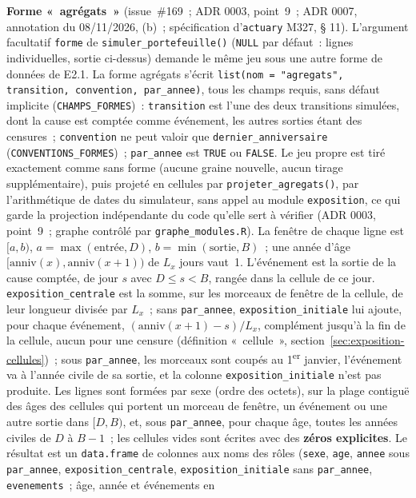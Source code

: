 \documentclass[a4paper,11pt]{article}
\newcommand{\code}[1]{\texttt{\small #1}}
\begin{document}
\medskip
\textbf{Forme «~agrégats~»} (issue~\#169~; ADR 0003, point~9~; ADR 0007,
annotation du 08/11/2026, (b)~; spécification d'\code{actuary} M327,
§ 11). L'argument facultatif \code{forme} de \code{simuler\_portefeuille()}
(\code{NULL} par défaut~: lignes individuelles, sortie ci-dessus) demande le
même jeu sous une autre forme de données de E2.1. La forme agrégats
s'écrit \code{list(nom = "agregats", transition, convention, par\_annee)},
tous les champs requis, sans défaut implicite (\code{CHAMPS\_FORMES})~:
\code{transition} est l'une des deux transitions simulées, dont la cause
est comptée comme événement, les autres sorties étant des censures~;
\code{convention} ne peut valoir que \code{dernier\_anniversaire}
(\code{CONVENTIONS\_FORMES})~; \code{par\_annee} est \code{TRUE} ou
\code{FALSE}. Le jeu propre est tiré exactement comme sans forme (aucune
graine nouvelle, aucun tirage supplémentaire), puis projeté en cellules par
\code{projeter\_agregats()}, par l'arithmétique de dates du simulateur,
sans appel au module \code{exposition}, ce qui garde la projection
indépendante du code qu'elle sert à vérifier (ADR 0003, point~9~; graphe
contrôlé par \code{graphe\_modules.R}). La fenêtre de chaque ligne est
$[a, b)$, $a = \max(\text{entrée}, D)$, $b = \min(\text{sortie}, B)$~; une
année d'âge $[\text{anniv}(x), \text{anniv}(x + 1))$ de $L_x$ jours vaut~1.
L'événement est la sortie de la cause comptée, de jour $s$ avec
$D \le s < B$, rangée dans la cellule de ce jour.
\code{exposition\_centrale} est la somme, sur les morceaux de fenêtre de la
cellule, de leur longueur divisée par $L_x$~; sans \code{par\_annee},
\code{exposition\_initiale} lui ajoute, pour chaque événement,
$(\text{anniv}(x + 1) - s) / L_x$, complément jusqu'à la fin de la cellule,
aucun pour une censure (définition «~cellule~», section~\ref{sec:exposition-cellules})~;
sous \code{par\_annee}, les morceaux sont coupés au 1\textsuperscript{er}
janvier, l'événement va à l'année civile de sa sortie, et la colonne
\code{exposition\_initiale} n'est pas produite. Les lignes sont formées par
sexe (ordre des octets), sur la plage contiguë des âges des cellules qui
portent un morceau de fenêtre, un événement ou une autre sortie dans
$[D, B)$, et, sous \code{par\_annee}, pour chaque âge, toutes les années
civiles de $D$ à $B - 1$~; les cellules vides sont écrites avec des
\textbf{zéros explicites}. Le résultat est un \code{data.frame} de colonnes
aux noms des rôles (\code{sexe}, \code{age}, \code{annee} sous
\code{par\_annee}, \code{exposition\_centrale}, \code{exposition\_initiale}
sans \code{par\_annee}, \code{evenements}~; âge, année et événements en
\end{document}
